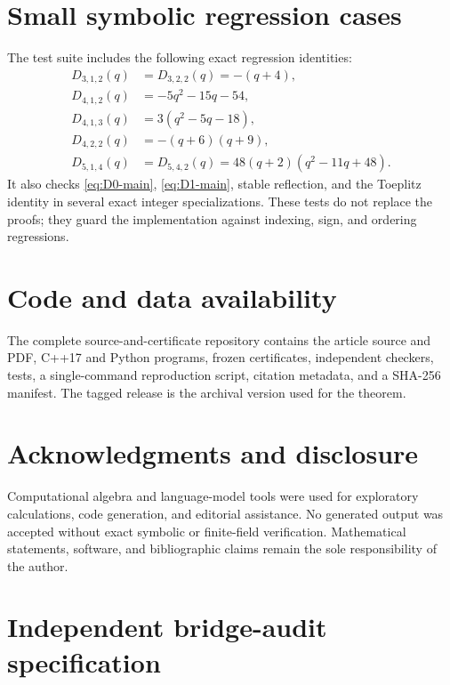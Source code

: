 \documentclass[11pt]{amsart}
\newcommand{\1}{\mathbf 1}
\theoremstyle{remark}
\begin{document}
\section{Small symbolic regression cases}
\label{app:smallcases}

The test suite includes the following exact regression identities:
\begin{align*}
 D_{3,1,2}(q)&=D_{3,2,2}(q)=-(q+4),\\
 D_{4,1,2}(q)&=-5q^2-15q-54,\\
 D_{4,1,3}(q)&=3(q^2-5q-18),\\
 D_{4,2,2}(q)&=-(q+6)(q+9),\\
 D_{5,1,4}(q)&=D_{5,4,2}(q)=48(q+2)(q^2-11q+48).
\end{align*}
It also checks \eqref{eq:D0-main}, \eqref{eq:D1-main}, stable reflection, and the Toeplitz identity in several exact integer specializations. These tests do not replace the proofs; they guard the implementation against indexing, sign, and ordering regressions.

\section*{Code and data availability}
The complete source-and-certificate repository contains the article source and PDF, C++17 and Python programs, frozen certificates, independent checkers, tests, a single-command reproduction script, citation metadata, and a SHA-256 manifest. The tagged release is the archival version used for the theorem.

\section*{Acknowledgments and disclosure}
Computational algebra and language-model tools were used for exploratory calculations, code generation, and editorial assistance. No generated output was accepted without exact symbolic or finite-field verification. Mathematical statements, software, and bibliographic claims remain the sole responsibility of the author.


\section{Independent bridge-audit specification}
\label{app:bridge-audit}
\end{document}
